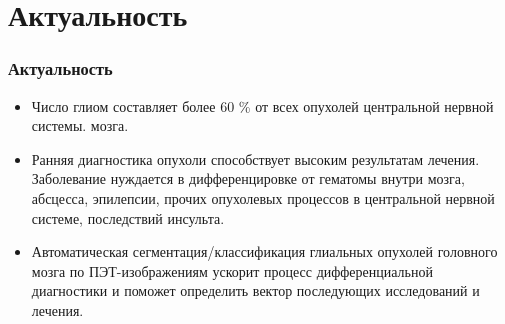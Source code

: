 \section{Актуальность}
\begin{frame}
    \frametitle{Актуальность}
    \begin{itemize}
        \item Число глиом составляет более 60 \% от всех опухолей центральной нервной системы.
        мозга.
        \item Ранняя диагностика опухоли способствует высоким результатам лечения. Заболевание нуждается в дифференцировке от 
        гематомы внутри мозга, абсцесса, эпилепсии, прочих опухолевых процессов в центральной нервной 
        системе, последствий инсульта.
        \item Автоматическая сегментация/классификация глиальных опухолей головного мозга по ПЭТ-изображениям
        ускорит процесс дифференциальной диагностики и поможет определить вектор последующих исследований и лечения.
        
    \end{itemize}
\end{frame}